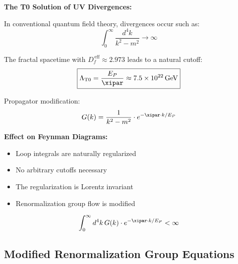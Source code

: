 	\begin{application}
		\textbf{The T0 Solution of UV Divergences:}
		
		In conventional quantum field theory, divergences occur such as:
		\begin{equation}
			\int_0^\infty \frac{d^4k}{k^2 - m^2} \to \infty
		\end{equation}
		
		The fractal spacetime with $D_f^{\,\text{eff}} \approx 2.973$ leads to a natural cutoff:
		\begin{equation}
			\boxed{\Lambda_{\text{T0}} = \frac{E_P}{\xipar} \approx 7.5 \times 10^{22}\, \text{GeV}}
		\end{equation}
		
		Propagator modification:
		\begin{equation}
			G(k) = \frac{1}{k^2 - m^2} \cdot e^{-\xipar \cdot k/E_P}
		\end{equation}
		
		\textbf{Effect on Feynman Diagrams:}
		\begin{itemize}
			\item Loop integrals are naturally regularized
			\item No arbitrary cutoffs necessary
			\item The regularization is Lorentz invariant
			\item Renormalization group flow is modified
		\end{itemize}
		
		\begin{equation}
			\int_0^\infty d^4k\, G(k) \cdot e^{-\xipar \cdot k/E_P} < \infty
		\end{equation}
	\end{application}
	
	\subsection{Modified Renormalization Group Equations}
	
